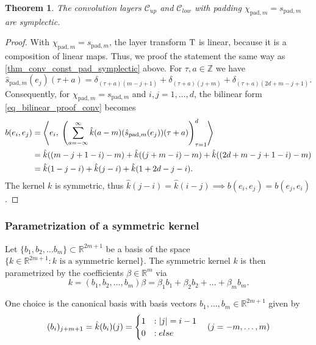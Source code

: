 \documentclass[twoside,a4paper]{article}
\newtheorem{theorem}{Theorem}
\begin{document}
\begin{theorem}
	The convolution layers $\mathcal{C}_{up}$ and $\mathcal{C}_{low}$
	with padding $\chi_{\text{pad},m} = s_{\text{pad},m}$ are symplectic.
\end{theorem}
\begin{proof}
	With $\chi_{\text{pad},m} = s_{\text{pad},m}$, the layer transform 
	$\mathrm{T}$ is linear, because it is a composition of linear maps. Thus,
	we proof the statement the same way as \cref{thm_conv_const_pad_symplectic} above.
	For $\tau,a \in \mathbb{Z}$ we have
	\begin{equation*}
		\hat{s}_{\text{pad},m}(e_j)(\tau + a) = 
		\delta_{(\tau + a) (m-j+1)} + \delta_{(\tau + a) (j+m)} + \delta_{(\tau + a) (2d+m-j+1)}
		.
	\end{equation*}
	Consequently, for $\chi_{\text{pad},m} = s_{\text{pad},m}$ and $i,j=1, \dots, d$, 
	the bilinear form \cref{eq_bilinear_proof_conv} becomes
	\begin{align*}
		b(e_i, e_j) &= \left\langle e_i,\; 
			\left( \sum_{a=-\infty}^{\infty} 
				\hat{k}(a-m)
				(\hat{s}_{\text{pad},m}(e_j))(\tau+a)
			\right)_{\tau=1}^d
		 \right\rangle \\
		&= \hat{k}((m-j+1-i)-m) + \hat{k}((j+m-i)-m) + \hat{k}((2d+m-j+1-i)-m) \\
		&= \hat{k}(1-j-i) + \hat{k}(j-i) + \hat{k}(1+2d-j-i)
		.
	\end{align*}
	The kernel $k$ is symmetric, thus $\hat{k}(j-i) = \hat{k}(i-j) \implies b(e_i, e_j) = b(e_j,e_i)$.
\end{proof}

\subsubsection*{Parametrization of a symmetric kernel}

Let $\{b_1, b_2, \dots b_m \} \subset \mathbb{R}^{2m+1}$ be a basis of the space 
$\{ k \in \mathbb{R}^{2m+1} : k \text{ is a symmetric kernel} \}$.
The symmetric kernel $k$ is then parametrized by the coefficients $\beta \in \mathbb{R}^m$ via
\begin{equation*}
	k = (b_1, b_2, \dots, b_m) \beta = \beta_1 b_1 + \beta_2 b_2 + \dots + \beta_m b_m
	.
\end{equation*}

One choice is the canonical basis with basis vectors $b_1, \dots, b_m \in \mathbb{R}^{2m+1}$ given by
\begin{equation*}
	(b_i)_{j+m+1} = \hat{k}(b_i)(j) = \begin{cases}
		1 &: \left|{j}\right| = i-1 \\
		0 &:else
	\end{cases} 
	\quad (j=-m, \dots, m)
\end{equation*}
\end{document}
